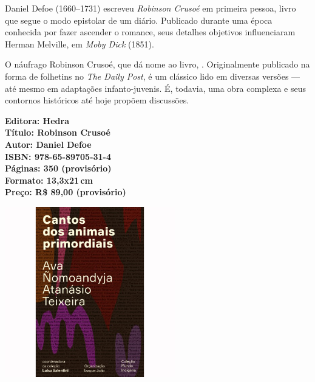 \noindent{}Daniel Defoe (1660--1731) escreveu \textit{Robinson Crusoé} em primeira pessoa, livro que segue o modo epistolar de um diário. Publicado durante uma época conhecida por fazer ascender o romance, seus detalhes objetivos influenciaram Herman Melville, em \textit{Moby Dick} (1851).

O náufrago Robinson Crusoé, que dá nome ao livro, . Originalmente publicado na forma de folhetins no \textit{The Daily Post}, é um clássico lido em diversas versões --- até mesmo em adaptações infanto-juvenis. É, todavia, uma obra complexa e seus contornos históricos até hoje propõem discussões. 

\vfill
\noindent\begin{minipage}[c]{1\linewidth}
{\small\textbf{
\hspace*{-.1cm}Editora: Hedra\\
Título: Robinson Crusoé\\
Autor: Daniel Defoe\\ 
ISBN: 978-65-89705-31-4\\
Páginas: 350 (provisório)\\
Formato: 13,3x21\,cm\\
Preço: R\$ 89,00 (provisório)\\
}}
\end{minipage}
\pagebreak

\begin{center}
\hspace*{-3.6cm}
\hspace*{3.1cm}\includegraphics[width=74mm]{./CAPAS/HEDRA_CANTOS.jpg}
\end{center}
\hspace*{-7cm}\hrulefill\hspace*{-7cm}
\medskip

